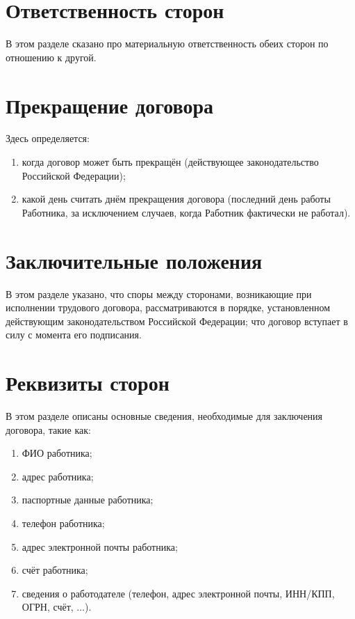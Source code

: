 \documentclass[a4paper]{article}
\begin{document}
	\section{Ответственность сторон}
		В этом разделе сказано про материальную ответственность обеих сторон по отношению к другой.
	
	\section{Прекращение договора}
		Здесь определяется:
		\begin{enumerate}
			\item когда договор может быть прекращён (действующее законодательство Российской Федерации);
			
			\item какой день считать днём прекращения договора (последний день работы Работника, за исключением случаев, когда Работник фактически не работал).
		\end{enumerate}
	\section{Заключительные положения}
		В этом разделе указано, что споры между сторонами, возникающие при исполнении трудового договора, рассматриваются в порядке, установленном действующим законодательством Российской Федерации; что договор вступает в силу с момента его подписания.
	\section{Реквизиты сторон}
		В этом разделе описаны основные сведения, необходимые для заключения договора, такие как:
		\begin{enumerate}
			\item ФИО работника;
			
			\item адрес работника;
			
			\item паспортные данные работника;
			
			\item телефон работника;
			
			\item адрес электронной почты работника;
			
			\item счёт работника;
			
			\item сведения о работодателе (телефон, адрес электронной почты, ИНН/КПП, ОГРН, счёт, $\dots$).
		\end{enumerate}
\end{document}
